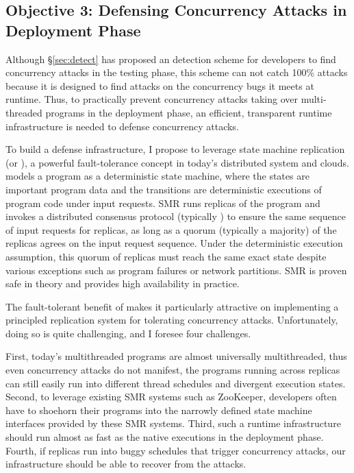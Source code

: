 \subsection{Objective 3: Defensing Concurrency Attacks in Deployment Phase} 
\label{sec:defense}

Although \S\ref{sec:detect} has proposed an detection scheme for developers to 
find concurrency attacks in the testing phase, this scheme can not catch 100\% 
attacks because it is designed to find attacks on the concurrency bugs it meets 
at runtime. Thus, to practically prevent concurrency attacks taking over 
multi-threaded programs in the deployment phase, an efficient, transparent 
runtime infrastructure is needed to defense concurrency attacks.

To build a defense infrastructure, I propose to leverage state machine 
replication (or \smr), a powerful fault-tolerance concept in today's 
distributed system and clouds. \smr models a program as a deterministic
state machine, where the states are important program data and the transitions 
are deterministic executions of program code under input requests. SMR runs 
replicas of the program and invokes a distributed consensus protocol 
(typically \paxos) to ensure the same sequence of input requests for replicas, 
as long as a quorum (typically a majority) of the replicas agrees on the input 
request sequence. Under the deterministic execution assumption, this quorum of 
replicas must reach the same exact state despite various exceptions such as 
program failures or network partitions. SMR is proven safe in theory and 
provides high availability in practice.

The fault-tolerant benefit of \smr makes it particularly attractive
on implementing a principled replication system for tolerating concurrency 
attacks. Unfortunately, doing so is quite challenging, and I foresee four 
challenges.

First, today's multithreaded programs are almost universally
multithreaded, thus even concurrency attacks do not manifest, the programs 
running across replicas can still easily run into different thread schedules 
and divergent execution states. Second, to leverage existing SMR systems such 
as ZooKeeper, developers often have to shoehorn their programs into the 
narrowly defined state machine interfaces provided by these SMR systems. Third, 
such a runtime infrastructure should run almost as fast as the native executions 
in the deployment phase. Fourth, if replicas run into buggy schedules that 
trigger concurrency attacks, our infrastructure should be able to recover from 
the attacks.

